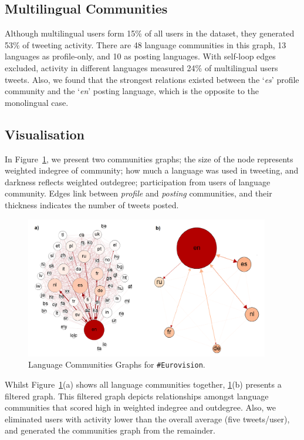 \documentclass{llncs}
\begin{document}
\subsection{Multilingual Communities}

Although multilingual users form 15\% of all users in the dataset,
they generated 53\% of tweeting activity. There are 48 language
communities in this graph, 13 languages as profile-only, and 10 as
posting languages. With self-loop edges excluded, activity in
different languages measured 24\% of multilingual users tweets. Also,
we found that the strongest relations existed between the `\emph{es}'
profile community and the `\emph{en}' posting language, which is the
opposite to the monolingual case.


\subsection{Visualisation}

In Figure~\ref{fig:communitiesgraphs}, we present two communities
graphs; the size of the node represents weighted indegree of
community; how much a language was used in tweeting, and darkness
reflects weighted outdegree; participation from users of language
community. Edges link between \emph{profile} and \emph{posting}
communities, and their thickness indicates the number of tweets
posted.

\begin{figure}[htb]
\centering
\includegraphics[width=0.95\textwidth]{images/communitiesgraphs.png}
\caption{Language Communities Graphs for {\texttt{\#Eurovision}}.}
\label{fig:communitiesgraphs}
\end{figure}

Whilst Figure~\ref{fig:communitiesgraphs}(a) shows all language
communities together, \ref{fig:communitiesgraphs}(b) presents a
filtered graph. This filtered graph depicts relationships amongst
language communities that scored high in weighted indegree and
outdegree. Also, we eliminated users with activity lower than the
overall average (five tweets/user), and generated the communities
graph from the remainder.
\end{document}
